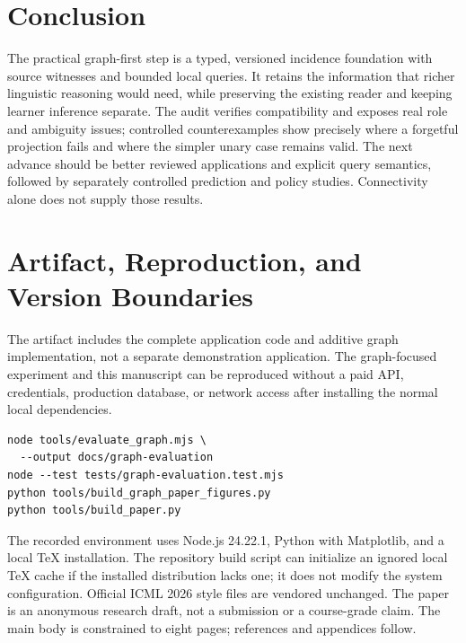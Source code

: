 \documentclass{article}
\begin{document}
\section{Conclusion}

The practical graph-first step is a typed, versioned incidence foundation with source witnesses and bounded local queries. It retains the information that richer linguistic reasoning would need, while preserving the existing reader and keeping learner inference separate. The audit verifies compatibility and exposes real role and ambiguity issues; controlled counterexamples show precisely where a forgetful projection fails and where the simpler unary case remains valid. The next advance should be better reviewed applications and explicit query semantics, followed by separately controlled prediction and policy studies. Connectivity alone does not supply those results.

\FloatBarrier


\appendix

\section{Artifact, Reproduction, and Version Boundaries}
\label{app:reproduction}

The artifact includes the complete application code and additive graph implementation, not a separate demonstration application. The graph-focused experiment and this manuscript can be reproduced without a paid API, credentials, production database, or network access after installing the normal local dependencies.

\begingroup\small
\begin{verbatim}
node tools/evaluate_graph.mjs \
  --output docs/graph-evaluation
node --test tests/graph-evaluation.test.mjs
python tools/build_graph_paper_figures.py
python tools/build_paper.py
\end{verbatim}
\endgroup

The recorded environment uses Node.js 24.22.1, Python with Matplotlib, and a local TeX installation. The repository build script can initialize an ignored local TeX cache if the installed distribution lacks one; it does not modify the system configuration. Official ICML 2026 style files are vendored unchanged. The paper is an anonymous research draft, not a submission or a course-grade claim. The main body is constrained to eight pages; references and appendices follow.
\end{document}
